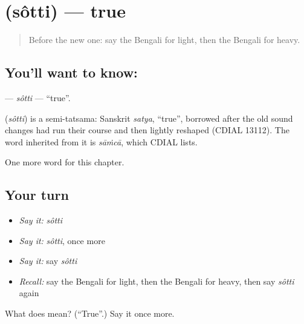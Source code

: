 \section[\texorpdfstring{\bn{সত্যি} (sôtti)}{সত্যি (sôtti)}]{ (sôtti) — true}

\label{lesson:BN-C76-sotti}



\begin{quote}
Before the new one: say the Bengali for light, then the Bengali for heavy.
\end{quote}

\subsection*{You'll want to know: }
\textbf{} — \emph{sôtti} — \textquotedblleft{}true\textquotedblright{}.

\begin{cousinweb}
\textbf{} (\emph{sôtti}) is a semi-tatsama: Sanskrit \emph{satya}, \textquotedblleft{}true\textquotedblright{}, borrowed after the old sound changes had run their course and then lightly reshaped (CDIAL 13112). The word inherited from it is \emph{sāṁcā}, which CDIAL lists.
\end{cousinweb}

\begin{grammarlens}[title={What you've built}]
One more word for this chapter.
\end{grammarlens}

\subsection*{Your turn}
\begin{itemize}
\raggedright
  \item \emph{Say it:} \emph{sôtti}
  \item \emph{Say it:} \emph{sôtti}, once more
  \item \emph{Say it:} say \emph{sôtti}
  \item \emph{Recall:} say the Bengali for light, then the Bengali for heavy, then say \emph{sôtti} again
\end{itemize}

\begin{tcolorbox}[breakable,colback=teal!4,colframe=teal!35!black,title={Before you move on}]
What does  mean? (\textquotedblleft{}True\textquotedblright{}.) Say it once more.
\end{tcolorbox}
